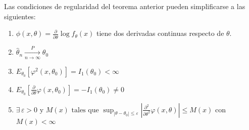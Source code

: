 \begin{observación}
  Las condiciones de regularidad del teorema anterior pueden simplificarse a las siguientes:\\
  \begin{enumerate}
    \item $\phi (x, \theta) = \frac{\partial}{\partial \theta} \log f_{\theta}(x)$ tiene dos derivadas continuas respecto de $\theta$.
    \item $\hat{\theta}_n \xrightarrow[n \to \infty]{P} \theta_0$
    \item $E_{\theta_0}[\varphi^2(x, \theta_0)] = I_1(\theta_0) < \infty$
    \item $E_{\theta_0} \left[ \frac{\partial}{\partial \theta} \varphi(x, \theta_0) \right] = - I_1(\theta_0) \neq 0$
    \item $\exists \, \varepsilon > 0 \text{ y } M(x) \text{ tales que } \sup_{|\theta - \theta_0| \leq \varepsilon} \left| \frac{\partial^2}{\partial \theta^2} \varphi(x, \theta) \right| \leq M(x)$ con $M(x) < \infty$
  \end{enumerate}
\end{observación}